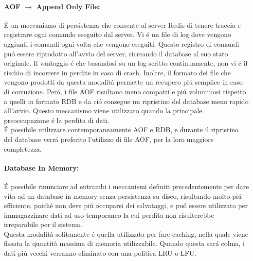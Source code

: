 \begin{itemize}
    \paragraph{AOF $\to$ Append Only File:}
    É un meccanismo di persistenza che consente al server Redis di tenere traccia e registrare ogni comando eseguito dal server.
    Vi é un file di log dove vengono aggiunti i comandi ogni volta che vengono eseguiti.
    Questo registro di comandi puó essere riprodotto all'avvio del server, ricreando il database al suo stato originale.
    Il vantaggio é che basandosi su un log scritto continuamente, non vi é il rischio di incorrere in perdite in caso di crash. Inoltre,
    il formato dei file che vengono prodotti da questa modalitá permette un recupero piú semplice in caso di corruzione.
    Peró, i file AOF risultano meno compatti e piú voluminosi rispetto a quelli in formato RDB e da ció consegue un ripristino del database
    meno rapido all'avvio. Questo meccanismo viene utilizzato quando la principale preoccupazione é la perdita di dati.\\

    É possibile utilizzare contemporaneamente AOF e RDB, e durante il ripristino del database verrá preferito l'utilizzo di file AOF, per la loro
    maggiore completezza.


    \paragraph{Database In Memory:}
    É possibile rinunciare ad entrambi i meccanismi definiti precedentemente per dare vita ad un database in memory senza persistenza su disco, risultando molto piú
    efficiente, poiché non deve piú occuparsi dei salvataggi, e puó essere utilizzato per immagazzinare dati ad uso temporaneo la cui
    perdita non risulterebbe irreparabile per il sistema.\\
    Questa modalità solitamente é quella utilizzata per fare caching, nella quale viene fissata la quantità massima di memoria utilizzabile. Quando questa sará
    colma, i dati piú vecchi verranno eliminato con una politica LRU o LFU.
\end{itemize}

